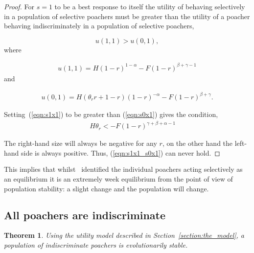 \documentclass[10pt]{article}
\newtheorem{theorem}{Theorem}
\begin{document}
\begin{proof}
    For \(s=1\) to be a best response to itself the utility of behaving 
    selectively in a population of selective poachers must be greater than the utility
    of a poacher behaving indiscriminately in a population of selective poachers,

    \begin{equation}
    u(1,1) > u(0,1),
    \end{equation}    
    where
    
    \begin{eqnarray}
    \label{eqn:s1x1}
    u(1,1) = H(1 - r)^{1 - \alpha} - F(1 - r)^{\beta + \gamma - 1}
    \end{eqnarray}    
    and 
    
    \begin{eqnarray}
    \label{eqn:s0x1}
    u(0,1) = H(\theta_r r +1 - r)(1 - r)^{-\alpha} - F(1 - r)^{\beta + \gamma} .
    \end{eqnarray}

    Setting~(\ref{eqn:s1x1}) to be greater than (\ref{eqn:s0x1}) gives the 
    condition,
    \begin{eqnarray}
    \label{eqn:s1x1_s0x1}
    &&H \theta_r< -F(1 - r)^{\gamma + \beta + \alpha - 1}
    \end{eqnarray}

    The right-hand size  will always be negative
    for any \(r\), on the other hand the left-hand side is always positive.
    Thus, (\ref{eqn:s1x1_s0x1}) can never hold. 
\end{proof}

This implies that whilst~\cite{Lee} identified the individual poachers 
acting selectively as an equilibrium it is an extremely week equilibrium from 
the point of view of population stability: a slight change and the population 
will change.

\subsection{All poachers are indiscriminate}

\begin{theorem}\label{theorem:indiscriminate}
Using the utility model described in Section~\ref{section:the_model}, a population 
of indiscriminate poachers is evolutionarily stable.
\end{theorem}
\end{document}
